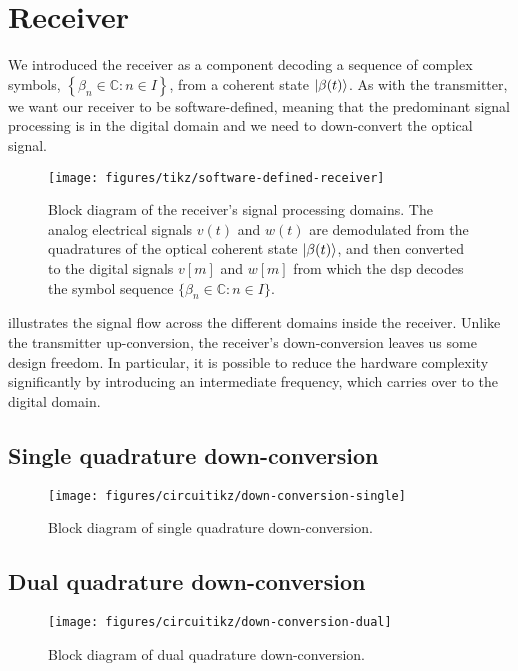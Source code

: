 \section{Receiver}
\FloatBarrier

We introduced the receiver as a component decoding a sequence of complex symbols, $\left\{\beta_n\in\mathbb{C}\colon n\in I\right\}$, from a coherent state $\lvert\beta(t)\rangle$.
As with the transmitter, we want our receiver to be software-defined, meaning that the predominant signal processing is in the digital domain and we need to down-convert the optical signal.
\begin{figure}[htb]
	\centering
	\texttt{[image: figures/tikz/software-defined-receiver]}
	\caption{Block diagram of the receiver's signal processing domains. The analog electrical signals $v(t)$ and $w(t)$ are demodulated from the quadratures of the optical coherent state $\lvert\beta(t)\rangle$, and then converted to the digital signals $v[m]$ and $w[m]$ from which the \gls{dsp} decodes the symbol sequence $\{\beta_n\in\mathbb{C}\colon n\in I\}$.}\label{fig:software_defined_receiver}
\end{figure}
 illustrates the signal flow across the different domains inside the receiver.
Unlike the transmitter up-conversion, the receiver's down-conversion leaves us some design freedom.
In particular, it is possible to reduce the hardware complexity significantly by introducing an intermediate frequency, which carries over to the digital domain.

\FloatBarrier
\subsection{Single quadrature down-conversion}

\begin{figure}[htb]
	\centering
	\texttt{[image: figures/circuitikz/down-conversion-single]}
	\caption{Block diagram of single quadrature down-conversion.}\label{fig:down_conversion_single}
\end{figure}

\FloatBarrier
\subsection{Dual quadrature down-conversion}

\begin{figure}[htb]
	\centering
	\texttt{[image: figures/circuitikz/down-conversion-dual]}
	\caption{Block diagram of dual quadrature down-conversion.}\label{fig:down_conversion_dual}
\end{figure}

